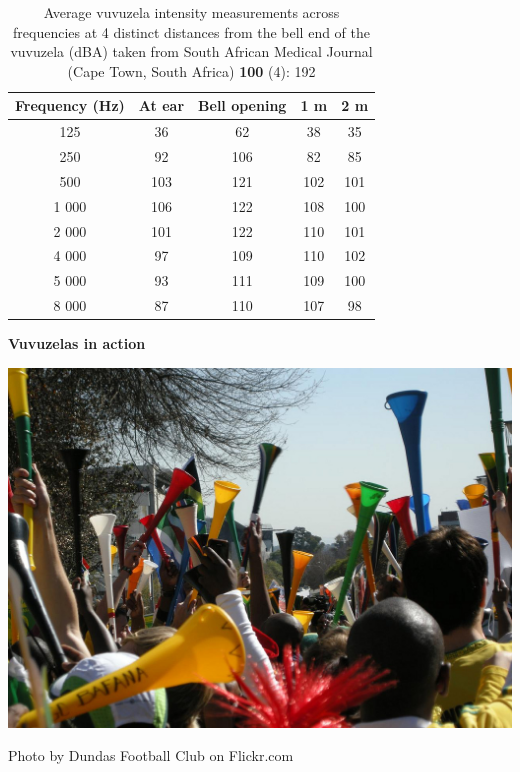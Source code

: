 \begin{minipage}{.5\textwidth}
\begin{table}[H]
\begin{tabular}{ccccc}\hline
Frequency (Hz) & At ear & Bell opening & 1 m & 2 m \\ \hline
125&   36  	&62	 &38	& 35 \\ \hline
250&	92 &	106	& 82	&	 85 \\ \hline
500&	103 & 121&	 102&	 101 		\\ \hline
1 000&	106 & 122&	 108&	 100 	\\  \hline
2 000&	101 & 122&	 110&	 101 	\\ \hline
4 000&	97 & 109&	 110&	 102 	\\ \hline
5 000&	93 & 111&	 109&	 100 		\\ \hline
8 000&  87 & 110&	 107&		 98 	\\ \hline
\end{tabular}
\label{table:vuvuzelas}
\caption{Average vuvuzela intensity measurements across frequencies at 4 distinct distances from the bell end of the vuvuzela (dBA) taken from South African Medical Journal (Cape Town, South Africa) \textbf{100} (4): 192}
\end{table}
\end{minipage}
\begin{minipage}{.5\textwidth}
\begin{center}
\textbf{Vuvuzelas in action}\par
\includegraphics[width=.8\columnwidth]{photos/vuvuzelas_dundas_football_club.jpg}\par
Photo by Dundas Football Club on Flickr.com
\end{center}
\end{minipage}

    \label{m38800*cid6}
